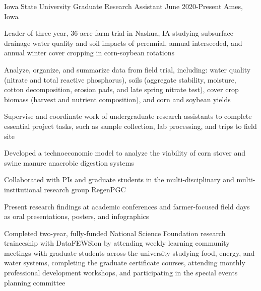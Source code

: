 

\begin{cventries}

  \cventry
    {Iowa State University} %
    {Graduate Research Assistant} %
    {June 2020-Present} %
    {Ames, Iowa} %
    {
      \begin{cvitems} %
      \setlength\itemsep{.4em}
        \item {Leader of three year, 36-acre farm trial in Nashua, IA studying subsurface drainage water quality and soil impacts of perennial, annual interseeded, and annual winter cover cropping in corn-soybean rotations }
        \item {Analyze, organize, and summarize data from field trial, including: water quality (nitrate and total reactive phosphorus), soils (aggregate stability, moisture, cotton decomposition, erosion pads, and late spring nitrate test), cover crop biomass (harvest and nutrient composition), and corn and soybean yields }
        \item {Supervise and coordinate work of undergraduate research assistants to complete essential project tasks, such as sample collection, lab processing, and trips to field site}
        \item {Developed a technoeconomic model to analyze the viability of corn stover and swine manure anaerobic digestion systems}
        \item {Collaborated with PIs and graduate students in the multi-disciplinary and multi-institutional research group RegenPGC}
         \item {Present research findings at academic conferences and farmer-focused field days as oral presentations, posters, and infographics}
        \item {Completed two-year, fully-funded National Science Foundation research traineeship with DataFEWSion by attending weekly learning community meetings with graduate students across the university studying food, energy, and water systems, completing the graduate certificate courses, attending monthly professional development workshops, and participating in the special events planning committee}

\end{cvitems}}
\end{cventries}
